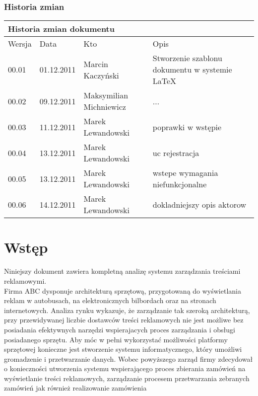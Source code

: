 \documentclass[10pt,a4paper,titlepage]{article} %
\begin{document}
	\subsubsection*{Historia zmian}
		\begin{table}[h]
		\begin{tabular}{|m{1cm}|m{2cm}|m{3.5cm}|m{6.5cm}|}
			\hline
			\multicolumn{4}{|l|}{Historia zmian dokumentu} \\
			\hline
			\hline Wersja  & Data & Kto & Opis  \\ 
			\hline 00.01 & 01.12.2011 & Marcin Kaczyński & Stworzenie szablonu dokumentu w systemie \LaTeX \\ 
			\hline 00.02 & 09.12.2011 & Maksymilian Michniewicz & ... \\ 
			\hline 00.03 & 11.12.2011 & Marek Lewandowski & poprawki w wstępie \\ 
			\hline 00.04 & 13.12.2011 & Marek Lewandowski & uc rejestracja \\ 
			\hline 00.05 & 13.12.2011 & Marek Lewandowski & wstepe wymagania
			niefunkcjonalne
			\\
			\hline 00.06 & 14.12.2011 & Marek Lewandowski & dokladniejszy opis aktorow \\
			\hline 
		\end{tabular} 
		\end{table}
	\newpage

	
	\tableofcontents
	\newpage
	

	\section{Wstęp}

		Niniejszy dokument zawiera kompletną analizę systemu zarządzania treściami
		reklamowymi.\\ 
		
		Firma ABC dysponuje architekturą sprzętową, przygotowaną do wyświetlania
		reklam w autobusach, na elektronicznych bilbordach oraz na stronach
		internetowych. Analiza rynku wykazuje, że zarządzanie tak szeroką architekturą,
		przy przewidywanej liczbie dostawców treści reklamowych nie jest możliwe
		bez posiadania efektywnych narzędzi wspierajacych proces zarządzania i obsługi
		posiadanego sprzętu. Aby móc w pełni wykorzystać możliwości platformy sprzętowej
		konieczne jest stworzenie systemu informatycznego, który umożliwi gromadzenie i 
		przetwarzanie danych. Wobec powyższego zarząd firmy zdecydował o konieczności
		utworzenia systemu wspierającego proces zbierania zamówień na wyświetlanie
		treści reklamowych, zarządzanie procesem przetwarzania zebranych zamówień jak 
		również realizowanie zamówienia\\
		
\end{document}

